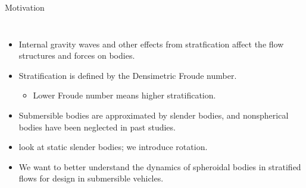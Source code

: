 \documentclass[aspectratio=169,xcolor=dvipsnames]{beamer}
\begin{document}
\begin{frame}{Motivation}

    \begin{columns}[c]

        \begin{itemize}
            \item Internal gravity waves and other effects from stratfication affect the flow structures and forces on bodies. 
            \item Stratification is defined by the Densimetric Froude number.
            \begin{itemize}
                \item Lower Froude number means higher stratification.
            \end{itemize}
            \item Submersible bodies are approximated by slender bodies, and nonspherical bodies have been neglected in past studies. 
            \item \cite{ortiz2019stratified} look at static slender bodies; we introduce rotation.
            \item We want to better understand the dynamics of spheroidal bodies in stratified flows for design in submersible vehicles. 
        \end{itemize}


\end{columns}
\end{frame}
\end{document}
